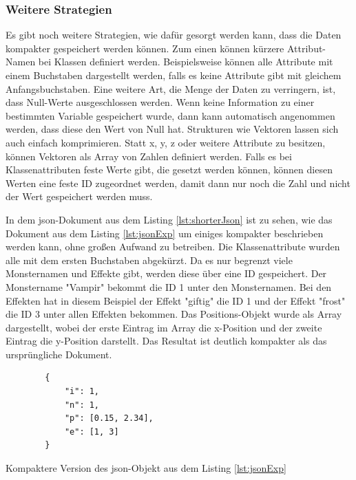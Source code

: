 \subsubsection{Weitere Strategien}
Es gibt noch weitere Strategien, wie dafür gesorgt werden kann, dass die Daten kompakter gespeichert werden können. Zum einen können kürzere Attribut-Namen bei Klassen definiert werden. Beispielsweise können alle Attribute mit einem Buchstaben dargestellt werden, falls es keine Attribute gibt mit gleichem Anfangsbuchstaben. Eine weitere Art, die Menge der Daten zu verringern, ist, dass Null-Werte ausgeschlossen werden. Wenn keine Information zu einer bestimmten Variable gespeichert wurde, dann kann automatisch angenommen werden, dass diese den Wert von Null hat. Strukturen wie Vektoren lassen sich auch einfach komprimieren. Statt x, y, z oder weitere Attribute zu besitzen, können Vektoren als Array von Zahlen definiert werden. Falls es bei Klassenattributen feste Werte gibt, die gesetzt werden können, können diesen Werten eine feste ID zugeordnet werden, damit dann nur noch die Zahl und nicht der Wert gespeichert werden muss.\cite{objelean2011json}\cite{baeldungReducingJSON}

In dem \ac{json}-Dokument aus dem Listing \ref{lst:shorterJson} ist zu sehen, wie das Dokument aus dem Listing \ref{lst:jsonExp} um einiges kompakter beschrieben werden kann, ohne großen Aufwand zu betreiben. Die Klassenattribute wurden alle mit dem ersten Buchstaben abgekürzt. Da es nur begrenzt viele Monsternamen und Effekte gibt, werden diese über eine ID gespeichert. Der Monstername "Vampir" bekommt die ID 1 unter den Monsternamen. Bei den Effekten hat in diesem Beispiel der Effekt "giftig" die ID 1 und der Effekt "frost" die ID 3 unter allen Effekten bekommen. Das Positions-Objekt wurde als Array dargestellt, wobei der erste Eintrag im Array die x-Position und der zweite Eintrag die y-Position darstellt. Das Resultat ist deutlich kompakter als das ursprüngliche Dokument.

\begin{listing}[htp]
    \begin{verbatim}
        {
            "i": 1,
            "n": 1,
            "p": [0.15, 2.34],
            "e": [1, 3]
        }
    \end{verbatim}
    \caption{Kompaktere Version des \ac{json}-Objekt aus dem Listing \ref{lst:jsonExp}}
    \label{lst:shorterJson}
\end{listing}




